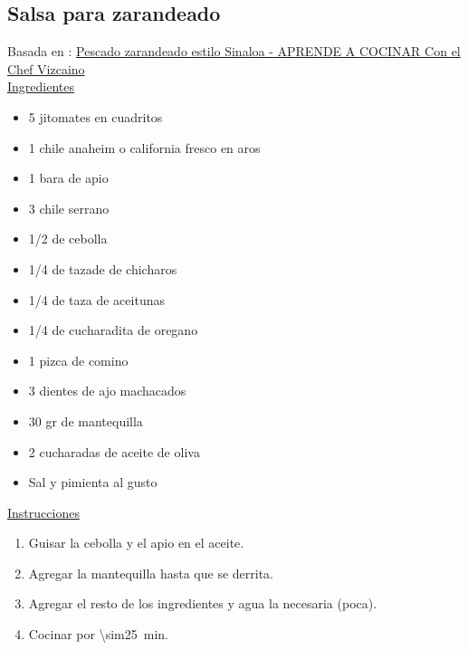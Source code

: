 \subsection{Salsa para zarandeado}

Basada en : \href{https://aprendeacocinarfacil.wordpress.com/2012/03/13/pescado-sarandeado-estilo-sinaloa-aya-pinchi/}{Pescado zarandeado estilo Sinaloa - APRENDE A COCINAR Con el Chef Vizcaino} \\

\underline{Ingredientes}
\begin{itemize}
\item 5 jitomates en cuadritos
\item 1 chile anaheim o california fresco en aros
\item 1 bara de apio
\item 3 chile serrano
\item 1/2 de cebolla
\item 1/4 de tazade de chicharos
\item 1/4 de taza de aceitunas
\item 1/4 de cucharadita de oregano
\item 1 pizca de comino
\item 3 dientes de ajo machacados
\item 30 gr de mantequilla
\item 2 cucharadas de aceite de oliva
\item Sal y pimienta al gusto
\end{itemize}


\underline{Instrucciones}
\begin{enumerate}
\item Guisar la cebolla y el apio en el aceite.
\item Agregar la mantequilla hasta que se derrita.
\item Agregar el resto de los ingredientes y agua la necesaria (poca).
\item Cocinar por \SI{\sim25}{min}.
\end{enumerate}
